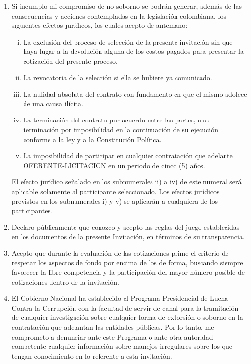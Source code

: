 \documentclass[11pt,a4paper]{letter} %
\begin{document}
\begin{letter}
\begin{enumerate}
\item Si incumplo mi compromiso de no soborno se podrán generar, además de las
consecuencias y acciones contempladas en la legislación colombiana, los
siguientes efectos jurídicos, los cuales acepto de antemano:

\begin{enumerate}[i.]
\item La exclusión del proceso de selección de la presente invitación sin que
haya lugar a la devolución alguna de los costos pagados para presentar la
cotización del presente proceso.

\item La revocatoria de la selección si ella se hubiere ya comunicado.

\item La nulidad absoluta del contrato con fundamento en que el mismo adolece
de una causa ilícita.

\item La terminación del contrato por acuerdo entre las partes, o su terminación por imposibilidad en la continuación de su ejecución conforme a la ley y a la Constitución Política.

\item La imposibilidad de participar en cualquier contratación que adelante
OFERENTE-LICITACION en un periodo de cinco (5) años.
\end{enumerate}

El efecto jurídico señalado en los subnumerales ii) a iv) de este numeral será
aplicable solamente al participante seleccionado. Los efectos jurídicos previstos
en los subnumerales i) y v) se aplicarán a cualquiera de los participantes.

\item Declaro públicamente que conozco y acepto las reglas del juego establecidas
en los documentos de la presente Invitación, en términos de su transparencia.

\item Acepto que durante la evaluación de las cotizaciones prime el criterio de
respetar los aspectos de fondo por encima de los de forma, buscando siempre
favorecer la libre competencia y la participación del mayor número posible de
cotizaciones dentro de la invitación.

\item El Gobierno Nacional ha establecido el Programa Presidencial de Lucha
Contra la Corrupción con la facultad de servir de canal para la tramitación de
cualquier investigación sobre cualquier forma de extorsión o soborno en la
contratación que adelantan las entidades públicas. Por lo tanto, me
comprometo a denunciar ante este Programa o ante otra autoridad competente
cualquier información sobre manejos irregulares sobre los que tengan
conocimiento en lo referente a esta invitación.
\\
\end{enumerate}


\end{letter}
\end{document}
